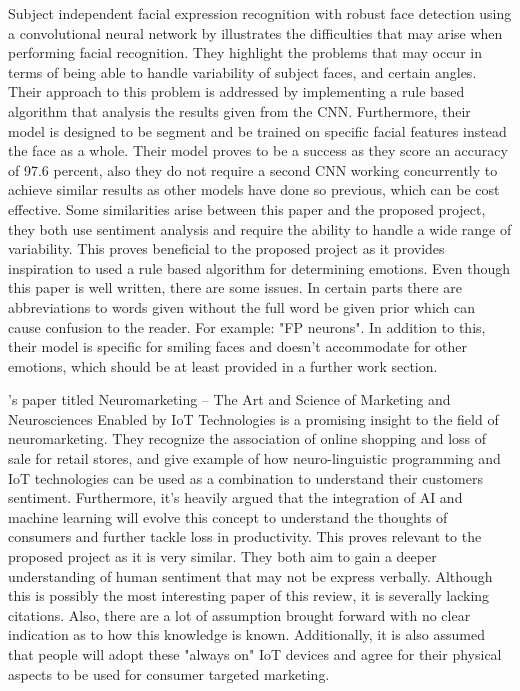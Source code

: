 Subject independent facial expression recognition with robust face detection using a convolutional neural network by \citeauthor{MATSUGU} illustrates the difficulties that may arise when performing facial recognition. They highlight the problems that may occur in terms of being able to handle variability of subject faces, and certain angles. Their approach to this problem is addressed by implementing a rule based algorithm that analysis the results given from the CNN. Furthermore, their model is designed to be segment and be trained on specific facial features instead the face as a whole. Their model proves to be a success as they score an accuracy of 97.6 percent, also they do not require a second CNN working concurrently to achieve similar results as other models have done so previous, which can be cost effective. Some similarities arise between this paper and the proposed project, they both use sentiment analysis and require the ability to handle a wide range of variability. This proves beneficial to the proposed project as it provides inspiration to used a rule based algorithm for determining emotions. Even though this paper is well written, there are some issues. In certain parts there are abbreviations to words given without the full word be given prior which can cause confusion to the reader. For example: "FP neurons". In addition to this, their model is specific for smiling faces and doesn't accommodate for other emotions, which should be at least provided in a further work section. 

 \citeauthor{arthmann}'s paper titled Neuromarketing – The Art and Science of Marketing and Neurosciences Enabled by IoT Technologies is a promising insight to the field of neuromarketing. They recognize the association of online shopping and loss of sale for retail stores, and give example of how neuro-linguistic programming and IoT technologies can be used as a combination to understand their customers sentiment. Furthermore, it's heavily argued that the integration of AI and machine learning will evolve this concept to understand the thoughts of consumers and further tackle loss in productivity. This proves relevant to the proposed project as it is very similar. They both aim to gain a deeper understanding of human sentiment that may not be express verbally. Although this is possibly the most interesting paper of this review, it is severally lacking citations. Also, there are a lot of assumption brought forward with no clear indication as to how this knowledge is known. Additionally, it is also assumed that people will adopt these "always on" IoT devices and agree for their physical aspects to be used for consumer targeted marketing. 


